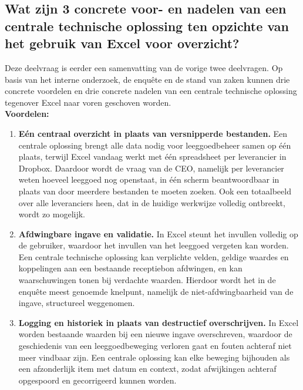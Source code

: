 \subsection{Wat zijn 3 concrete voor- en nadelen van een centrale technische oplossing ten opzichte van het gebruik van Excel voor overzicht?}

Deze deelvraag is eerder een samenvatting van de vorige twee deelvragen. Op basis van het interne onderzoek, de enquête en de stand van zaken kunnen drie concrete voordelen en drie concrete nadelen van een centrale technische oplossing tegenover Excel naar voren geschoven worden.
\\
\textbf{Voordelen:}
\begin{enumerate}
    \item[1.] \textbf{Eén centraal overzicht in plaats van versnipperde bestanden.} Een centrale oplossing brengt alle data nodig voor leeggoedbeheer samen op één plaats, terwijl Excel vandaag werkt met één spreadsheet per leverancier in Dropbox. Daardoor wordt de vraag van de CEO, namelijk per leverancier weten hoeveel leeggoed nog openstaat, in één scherm beantwoordbaar in plaats van door meerdere bestanden te moeten zoeken. Ook een totaalbeeld over alle leveranciers heen, dat in de huidige werkwijze volledig ontbreekt, wordt zo mogelijk.
    \item[2.] \textbf{Afdwingbare ingave en validatie.} In Excel steunt het invullen volledig op de gebruiker, waardoor het invullen van het leeggoed vergeten kan worden. Een centrale technische oplossing kan verplichte velden, geldige waardes en koppelingen aan een bestaande receptiebon afdwingen, en kan waarschuwingen tonen bij verdachte waarden. Hierdoor wordt het in de enquête meest genoemde knelpunt, namelijk de niet-afdwingbaarheid van de ingave, structureel weggenomen.
    \item[3.] \textbf{Logging en historiek in plaats van destructief overschrijven.} In Excel worden bestaande waarden bij een nieuwe ingave overschreven, waardoor de geschiedenis van een leeggoedbeweging verloren gaat en fouten achteraf niet meer vindbaar zijn. Een centrale oplossing kan elke beweging bijhouden als een afzonderlijk item met datum en context, zodat afwijkingen achteraf opgespoord en gecorrigeerd kunnen worden.
\end{enumerate}

